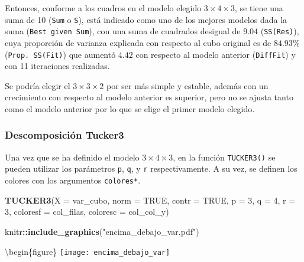 \documentclass[
  spanish,
]{article}
\newenvironment{Shaded}{\begin{snugshade}}{\end{snugshade}}
\newcommand{\DataTypeTok}[1]{\textcolor[rgb]{0.13,0.29,0.53}{#1}}
\newcommand{\DecValTok}[1]{\textcolor[rgb]{0.00,0.00,0.81}{#1}}
\newcommand{\KeywordTok}[1]{\textcolor[rgb]{0.13,0.29,0.53}{\textbf{#1}}}
\newcommand{\NormalTok}[1]{#1}
\newcommand{\OperatorTok}[1]{\textcolor[rgb]{0.81,0.36,0.00}{\textbf{#1}}}
\newcommand{\OtherTok}[1]{\textcolor[rgb]{0.56,0.35,0.01}{#1}}
\newcommand{\StringTok}[1]{\textcolor[rgb]{0.31,0.60,0.02}{#1}}
\begin{document}
Entonces, conforme a los cuadros en el modelo elegido \(3 \times 4 \times 3\), se tiene una suma de 10 (\texttt{Sum} o \texttt{S}), está indicado como uno de los mejores modelos dada la suma (\texttt{Best\ given\ Sum}), con una suma de cuadrados desigual de \(9.04\) (\texttt{SS(Res)}), cuya proporción de varianza explicada con respecto al cubo original es de \(84.93\%\) (\texttt{Prop.\ SS(Fit)}) que aumentó \(4.42\) con respecto al modelo anterior (\texttt{DiffFit}) y con 11 iteraciones realizadas.

Se podría elegir el \(3 \times 3 \times 2\) por ser más simple y estable, además con un crecimiento con respecto al modelo anterior es superior, pero no se ajusta tanto como el modelo anterior por lo que se elige el primer modelo elegido.

\hypertarget{descomposiciuxf3n-tucker3}{%
\subsubsection{Descomposición Tucker3}\label{descomposiciuxf3n-tucker3}}

Una vez que se ha definido el modelo \(3 \times 4 \times 3\), en la función \texttt{TUCKER3()} se pueden utilizar los parámetros \texttt{p}, \texttt{q}, y \texttt{r} respectivamente. A su vez, se definen los colores con los argumentos \texttt{colores*}.

\begin{Shaded}
\begin{Highlighting}[]
\KeywordTok{TUCKER3}\NormalTok{(}\DataTypeTok{X =}\NormalTok{ var\_cubo,}
        \DataTypeTok{norm =} \OtherTok{TRUE}\NormalTok{,}
        \DataTypeTok{contr =} \OtherTok{TRUE}\NormalTok{,}
        \DataTypeTok{p =} \DecValTok{3}\NormalTok{,}
        \DataTypeTok{q =} \DecValTok{4}\NormalTok{,}
        \DataTypeTok{r =} \DecValTok{3}\NormalTok{,}
        \DataTypeTok{coloresf =}\NormalTok{ col\_filas,}
        \DataTypeTok{coloresc =}\NormalTok{ col\_col\_y)}
\end{Highlighting}
\end{Shaded}

\begin{Shaded}
\begin{Highlighting}[]
\NormalTok{knitr}\OperatorTok{::}\KeywordTok{include\_graphics}\NormalTok{(}\StringTok{"encima\_debajo\_var.pdf"}\NormalTok{)}
\end{Highlighting}
\end{Shaded}

\textbackslash begin\{figure\}
\texttt{[image: encima\_debajo\_var]}
\end{document}
